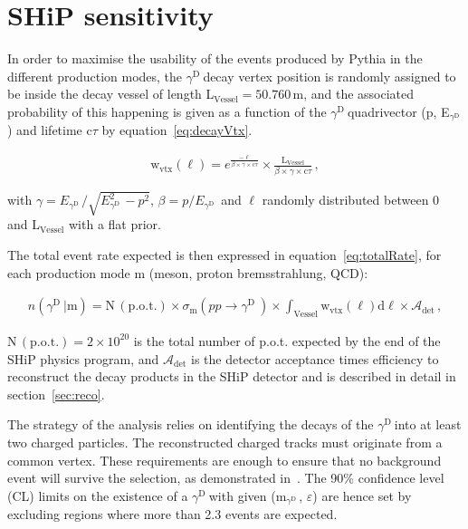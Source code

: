 \documentclass[12pt,a4paper]{article}
\newcommand{\mathDP}{\gamma^{\mathrm{D}}\ }
\newcommand{\DP}{$\mathDP$}
\newcommand{\mDP}{m$_{\mathDP}$}
\begin{document}
\section{SHiP sensitivity}
\label{sec:sensitivity}

In order to maximise the usability of the events produced by Pythia in
the different production modes, the \DP decay vertex position is
randomly assigned to be inside the decay vessel of length
L$_{\mathrm{Vessel}}= 50.760$\,m, and the associated probability of
this happening is given as a function of the \DP quadrivector (p,
E$_{\mathDP}$) and lifetime $\mathrm{c}\tau$ by
equation~\ref{eq:decayVtx}.

\begin{align}
\mathrm{w}_{\mathrm{vtx}}(\ell) = e^{\frac{-\ell}{\beta\times\gamma\times \mathrm{c}\tau}}\times \frac{\mathrm{L}_{\mathrm{Vessel}}}{\beta\times \gamma \times \mathrm{c}\tau}\,,\label{eq:decayVtx}
\end{align}

with $\gamma = E_{\mathDP}/\sqrt{E_{\mathDP}^2-p^2}$, $\beta =
p/E_{\mathDP}$ and $\ell$ randomly distributed between 0 and
L$_{\mathrm{Vessel}}$ with a flat prior.

The total event rate expected is then expressed in
equation~\ref{eq:totalRate}, for each production mode $\mathrm{m}$
(meson, proton bremsstrahlung, QCD):

\begin{align}
	n(\mathDP | \mathrm{m}) = \mathrm{N\,(p.o.t.)} \times \sigma_{\mathrm{m}}(pp \to \mathDP) \times  \int_{\mathrm{Vessel}} \mathrm{w}_{\mathrm{vtx}}(\ell)\mathrm{d}\ell  \times \mathcal{A}_{\mathrm{det}}\,,\label{eq:totalRate}
\end{align}

$\mathrm{N\,(p.o.t.)} = 2 \times 10^{20}$ is the total number of
p.o.t. expected by the end of the SHiP physics program, and
$\mathcal{A}_{\mathrm{det}}$ is the detector acceptance times efficiency
to reconstruct the decay products in the SHiP detector and is
described in detail in section~\ref{sec:reco}.

The strategy of the analysis relies on identifying the decays of the
\DP into at least two charged particles. The reconstructed charged
tracks must originate from a common vertex. These requirements are
enough to ensure that no background event will survive the selection,
as demonstrated in~\cite{TP,PP}.  The 90\% confidence level (CL) limits on
the existence of a \DP with given (\mDP, $\varepsilon$) are hence set
by excluding regions where more than 2.3 events are expected.
\end{document}
